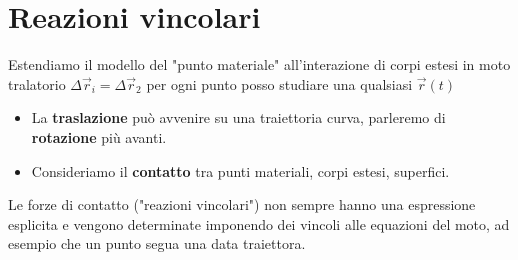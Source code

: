 \section{Reazioni vincolari}
Estendiamo il modello del "punto materiale" all'interazione di corpi estesi in moto tralatorio
$\Delta \vec{r}_i = \Delta \vec{r}_2$ per ogni punto posso studiare una qualsiasi $\vec{r}(t)$
\begin{itemize}
    \item La \textbf{traslazione} può avvenire su una traiettoria curva, parleremo di \textbf{rotazione} più avanti.
    \item Consideriamo il \textbf{contatto} tra punti materiali, corpi estesi, superfici.
\end{itemize}
Le forze di contatto ("reazioni vincolari") non sempre hanno una espressione esplicita e vengono determinate imponendo dei vincoli alle 
equazioni del moto, ad esempio che un punto segua una data traiettora.
